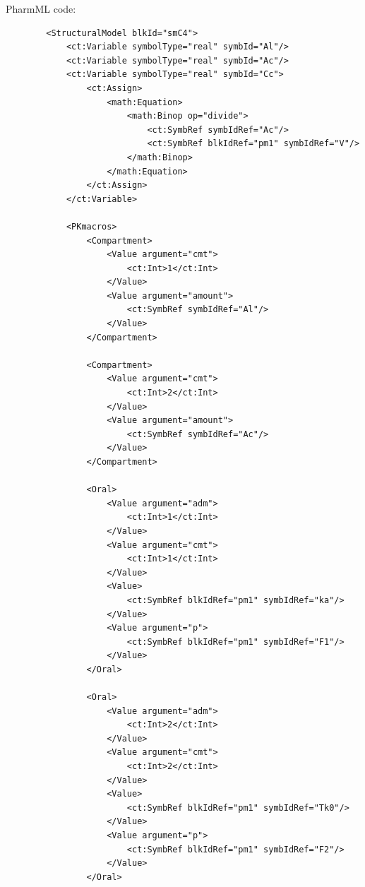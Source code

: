 PharmML code:
\lstset{language=XML}
\begin{lstlisting}
        <StructuralModel blkId="smC4">
            <ct:Variable symbolType="real" symbId="Al"/>
            <ct:Variable symbolType="real" symbId="Ac"/>
            <ct:Variable symbolType="real" symbId="Cc">
                <ct:Assign>
                    <math:Equation>
                        <math:Binop op="divide">
                            <ct:SymbRef symbIdRef="Ac"/>
                            <ct:SymbRef blkIdRef="pm1" symbIdRef="V"/>
                        </math:Binop>
                    </math:Equation>
                </ct:Assign>
            </ct:Variable>
            
            <PKmacros>
                <Compartment>
                    <Value argument="cmt">
                        <ct:Int>1</ct:Int>
                    </Value>
                    <Value argument="amount">
                        <ct:SymbRef symbIdRef="Al"/>
                    </Value>
                </Compartment>
                
                <Compartment>
                    <Value argument="cmt">
                        <ct:Int>2</ct:Int>
                    </Value>
                    <Value argument="amount">
                        <ct:SymbRef symbIdRef="Ac"/>
                    </Value>
                </Compartment>
                
                <Oral>
                    <Value argument="adm">
                        <ct:Int>1</ct:Int>
                    </Value>
                    <Value argument="cmt">
                        <ct:Int>1</ct:Int>
                    </Value>
                    <Value>
                        <ct:SymbRef blkIdRef="pm1" symbIdRef="ka"/>
                    </Value>
                    <Value argument="p">
                        <ct:SymbRef blkIdRef="pm1" symbIdRef="F1"/>
                    </Value>
                </Oral>
                
                <Oral>
                    <Value argument="adm">
                        <ct:Int>2</ct:Int>
                    </Value>
                    <Value argument="cmt">
                        <ct:Int>2</ct:Int>
                    </Value>
                    <Value>
                        <ct:SymbRef blkIdRef="pm1" symbIdRef="Tk0"/>
                    </Value>
                    <Value argument="p">
                        <ct:SymbRef blkIdRef="pm1" symbIdRef="F2"/>
                    </Value>
                </Oral>
                

\end{lstlisting}
